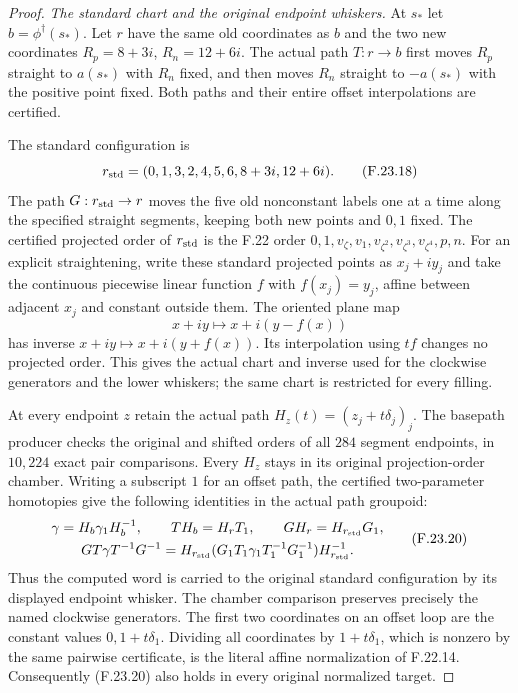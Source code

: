 \begin{proof}
\emph{The standard chart and the original endpoint whiskers.}
At $s_*$ let $b=\phi^\dagger(s_*)$. Let $r$ have the same old
coordinates as $b$ and the two new coordinates
$R_p=8+3i$, $R_n=12+6i$. The actual path $T:r\to b$ first
moves $R_p$ straight to $a(s_*)$ with $R_n$ fixed, and then
moves $R_n$ straight to $-a(s_*)$ with the positive point fixed.
Both paths and their entire offset interpolations are certified.

The standard configuration is
\[
 r_{\rm std}=(0,1,3,2,4,5,6,8+3i,12+6i).                      \tag{F.23.18}
\]
The path $G:r_{\rm std}\to r$ moves the five old nonconstant
labels one at a time along the specified straight segments,
keeping both new points and $0,1$ fixed. The certified projected
order of $r_{\rm std}$ is the F.22 order
$0,1,v_\zeta,v_1,v_{\zeta^2},v_{\zeta^3},v_{\zeta^4},p,n$.
For an explicit straightening, write these standard projected
points as $x_j+iy_j$ and take the continuous piecewise linear
function $f$ with $f(x_j)=y_j$, affine between adjacent $x_j$
and constant outside them. The oriented plane map
\[
 x+iy\longmapsto x+i(y-f(x))
                                                               \tag{F.23.19}
\]
has inverse $x+iy\mapsto x+i(y+f(x))$. Its interpolation using
$tf$ changes no projected order. This gives the actual chart
and inverse used for the clockwise generators and the lower
whiskers; the same chart is restricted for every filling.

At every endpoint $z$ retain the actual path
$H_z(t)=(z_j+t\delta_j)_j$. The basepath producer checks
the original and shifted orders of all $284$ segment endpoints,
in $10,224$ exact pair comparisons. Every $H_z$ stays in its
original projection-order chamber. Writing a subscript $1$
for an offset path, the certified two-parameter homotopies give
the following identities in the actual path groupoid:
\[
 \begin{gathered}
 \gamma=H_b\gamma_1H_b^{-1},\qquad
 TH_b=H_rT_1,\qquad GH_r=H_{r_{\rm std}}G_1,\\
 GT\gamma T^{-1}G^{-1}
 =H_{r_{\rm std}}
       (G_1T_1\gamma_1T_1^{-1}G_1^{-1})H_{r_{\rm std}}^{-1}.
 \end{gathered}                                                \tag{F.23.20}
\]
Thus the computed word is carried to the original standard
configuration by its displayed endpoint whisker. The chamber
comparison preserves precisely the named clockwise generators.
The first two coordinates on an offset loop are the constant
values $0,1+t\delta_1$. Dividing all coordinates by
$1+t\delta_1$, which is nonzero by the same pairwise certificate,
is the literal affine normalization of F.22.14. Consequently
(F.23.20) also holds in every original normalized target.


\end{proof}
